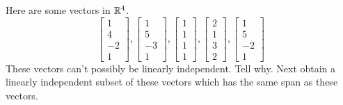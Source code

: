 \documentclass{ximera}
\begin{document}
\begin{problem}\label{prb:3.32} Here are some vectors in $\mathbb{R}^{4}$.
\begin{equation*}
\left[
\begin{array}{r}
1 \\
4 \\
-2 \\
1
\end{array}
\right] ,\left[
\begin{array}{r}
1 \\
5 \\
-3 \\
1
\end{array}
\right] ,\left[
\begin{array}{r}
1 \\
1 \\
1 \\
1
\end{array}
\right] ,\left[
\begin{array}{r}
2 \\
1 \\
3 \\
2
\end{array}
\right] ,\left[
\begin{array}{r}
1 \\
5 \\
-2 \\
1
\end{array}
\right]
\end{equation*}
These vectors can't possibly be linearly independent. Tell why. Next obtain a
linearly independent subset of these vectors which has the same span as
these vectors. 
\end{problem}
\end{document}
